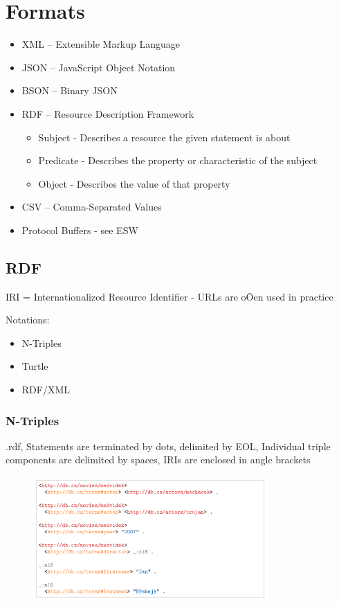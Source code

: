 \section{Formats}
\begin{itemize}
    \item XML – Extensible Markup Language
    \item JSON – JavaScript Object Notation
    \item BSON – Binary JSON
    \item RDF – Resource Description Framework
    \begin{itemize}
        \item Subject - Describes a resource the given statement is about
        \item Predicate - Describes the property or characteristic of the subject
        \item Object - Describes the value of that property
    \end{itemize}
    \item CSV – Comma-Separated Values
    \item Protocol Buffers - see ESW
\end{itemize}

\subsection{RDF}

IRI = Internationalized Resource Identifier - URLs are oŌen used in practice

Notations:
\begin{itemize}
    \item N-Triples
    \item Turtle
    \item RDF/XML
\end{itemize}

\subsubsection{N-Triples}
.rdf, Statements are terminated by dots, delimited by EOL, Individual triple components are delimited by spaces, IRIs are enclosed in angle brackets

\begin{figure}[ht!]
\centering
\includegraphics[width=0.8\textwidth]{oborove/DS2/img/ntrip.png}
\end{figure}

